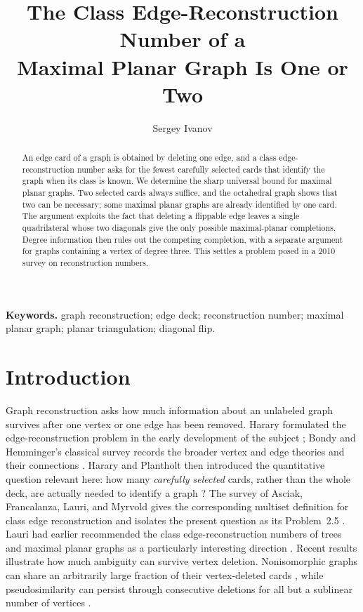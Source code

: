 \documentclass[11pt]{article}
\title{The Class Edge-Reconstruction Number of a\\
Maximal Planar Graph Is One or Two}
\author{Sergey Ivanov}
\date{}
\theoremstyle{definition}
\theoremstyle{remark}
\begin{document}
\maketitle

\begin{abstract}
An edge card of a graph is obtained by deleting one edge, and a class
edge-reconstruction number asks for the fewest carefully selected cards that
identify the graph when its class is known.  We determine the sharp universal
bound for maximal planar graphs.  Two selected cards always suffice, and the
octahedral graph shows that two can be necessary; some maximal planar graphs
are already identified by one card.  The argument exploits the fact that
deleting a flippable edge leaves a single quadrilateral whose two diagonals
give the only possible maximal-planar completions.  Degree information then
rules out the competing completion, with a separate argument for graphs
containing a vertex of degree three.  This settles a problem posed in a 2010
survey on reconstruction numbers.
\end{abstract}

\noindent\textbf{Keywords.} graph reconstruction; edge deck; reconstruction
number; maximal planar graph; planar triangulation; diagonal flip.


\section{Introduction}

Graph reconstruction asks how much information about an unlabeled graph
survives after one vertex or one edge has been removed.  Harary formulated
the edge-reconstruction problem in the early development of the subject
\cite{Harary1964}; Bondy and Hemminger's classical survey records the broader
vertex and edge theories and their connections \cite{BondyHemminger1977}.
Harary and Plantholt then introduced the quantitative question relevant here:
how many \emph{carefully selected} cards, rather than the whole deck, are
actually needed to identify a graph \cite{HararyPlantholt1985}?  The survey of
Asciak, Francalanza, Lauri, and Myrvold gives the corresponding multiset
definition for class edge reconstruction and isolates the present question
as its Problem~2.5 \cite{AsciakEtAl2010}.  Lauri had earlier recommended the
class edge-reconstruction numbers of trees and maximal planar graphs as a
particularly interesting direction \cite{Lauri1993}. Recent results illustrate how much ambiguity can survive vertex deletion.
Nonisomorphic graphs can share an arbitrarily large fraction of their
vertex-deleted cards \cite{IvanovDeckOverlap2026}, while pseudosimilarity can
persist through consecutive deletions for all but a sublinear number of
vertices \cite{IvanovPseudosimilarity2026}.
\end{document}
